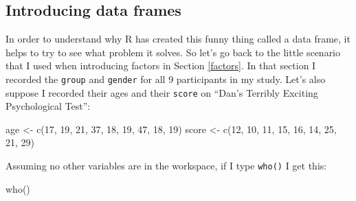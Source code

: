 \documentclass[
]{book}
\newenvironment{Shaded}{\begin{snugshade}}{\end{snugshade}}
\newcommand{\DecValTok}[1]{\textcolor[rgb]{0.00,0.00,0.81}{#1}}
\newcommand{\FunctionTok}[1]{\textcolor[rgb]{0.00,0.00,0.00}{#1}}
\newcommand{\NormalTok}[1]{#1}
\newcommand{\OtherTok}[1]{\textcolor[rgb]{0.56,0.35,0.01}{#1}}
\begin{document}
\hypertarget{introducing-data-frames}{%
\subsection{Introducing data frames}\label{introducing-data-frames}}

In order to understand why R has created this funny thing called a data frame, it helps to try to see what problem it solves. So let's go back to the little scenario that I used when introducing factors in Section \ref{factors}. In that section I recorded the \texttt{group} and \texttt{gender} for all 9 participants in my study. Let's also suppose I recorded their ages and their \texttt{score} on ``Dan's Terribly Exciting Psychological Test'':

\begin{Shaded}
\begin{Highlighting}[]
\NormalTok{age }\OtherTok{\textless{}{-}} \FunctionTok{c}\NormalTok{(}\DecValTok{17}\NormalTok{, }\DecValTok{19}\NormalTok{, }\DecValTok{21}\NormalTok{, }\DecValTok{37}\NormalTok{, }\DecValTok{18}\NormalTok{, }\DecValTok{19}\NormalTok{, }\DecValTok{47}\NormalTok{, }\DecValTok{18}\NormalTok{, }\DecValTok{19}\NormalTok{)}
\NormalTok{score }\OtherTok{\textless{}{-}} \FunctionTok{c}\NormalTok{(}\DecValTok{12}\NormalTok{, }\DecValTok{10}\NormalTok{, }\DecValTok{11}\NormalTok{, }\DecValTok{15}\NormalTok{, }\DecValTok{16}\NormalTok{, }\DecValTok{14}\NormalTok{, }\DecValTok{25}\NormalTok{, }\DecValTok{21}\NormalTok{, }\DecValTok{29}\NormalTok{)}
\end{Highlighting}
\end{Shaded}

Assuming no other variables are in the workspace, if I type \texttt{who()} I get this:

\begin{Shaded}
\begin{Highlighting}[]
\FunctionTok{who}\NormalTok{()}
\end{Highlighting}
\end{Shaded}
\end{document}
